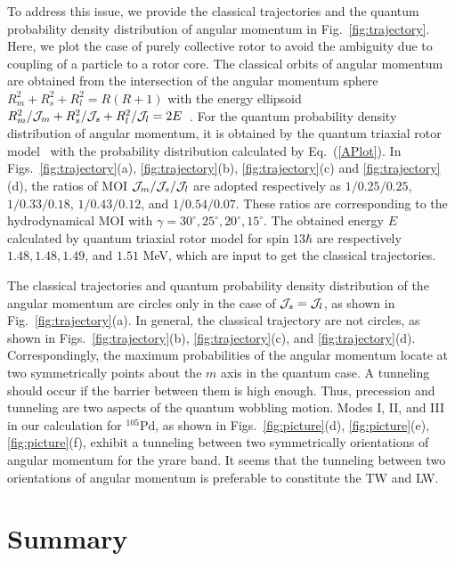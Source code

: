 \documentclass[aps,prc,preprint,showpacs,groupedaddress,floatfix,amsmath,amssymb]{revtex4-1}
\begin{document}
To address
this issue, we provide the classical trajectories and the quantum probability density distribution of angular momentum in Fig.~\ref{fig:trajectory}. Here, we plot the case of purely collective rotor to avoid the ambiguity due to coupling of a particle to a rotor core.
The classical orbits of angular momentum are obtained from  the intersection of the angular momentum sphere
$R_{m}^{2}+R_{s}^{2}+R_{l}^{2}=R(R+1)$
with the energy ellipsoid
$R_{m}^{2}/{\cal J}_{m}+R_{s}^{2}/{\cal J}_{s}+R_{l}^{2}/{\cal J}_{l}=2E$~\cite{Landau,Lawrie20,Frauendorf14}.
For the quantum probability density distribution of angular momentum, it is obtained by the quantum triaxial rotor model~\cite{Bohr75} with  the probability distribution calculated by Eq.~(\ref{APlot}).
In Figs.~\ref{fig:trajectory}(a), \ref{fig:trajectory}(b), \ref{fig:trajectory}(c) and \ref{fig:trajectory}(d), the ratios of MOI ${\cal J}_{m}/{\cal J}_{s}/{\cal J}_{l}$ are adopted respectively as $1/0.25/0.25$, $1/0.33/0.18$, $1/0.43/0.12$, and $1/0.54/0.07$. These ratios are corresponding to the hydrodynamical MOI with $\gamma=30^{\circ},25^{\circ},20^{\circ},15^{\circ}$.
The obtained energy $E$ calculated by quantum triaxial rotor model for spin $13\hbar$ are respectively $1.48, 1.48, 1.49$, and $1.51$ MeV, which are input to get the classical trajectories.


The classical trajectories  and quantum probability density distribution  of the angular momentum are circles only in the case of ${\cal J}_{s}={\cal J}_{l}$, as shown in Fig.~\ref{fig:trajectory}(a).
In general, the classical trajectory are not circles, as shown in Figs.~\ref{fig:trajectory}(b), \ref{fig:trajectory}(c), and \ref{fig:trajectory}(d). Correspondingly,
the maximum probabilities of the angular momentum locate at two symmetrically points about the $m$ axis in the quantum case. A tunneling should occur if the barrier between them is high enough.
Thus,  precession and tunneling are two aspects of the quantum wobbling motion.
Modes I, II, and III in our calculation for $^{105}$Pd, as shown in Figs.~\ref{fig:picture}(d), \ref{fig:picture}(e), \ref{fig:picture}(f), exhibit a tunneling between two symmetrically
orientations of angular momentum for the yrare band.
It seems that the tunneling between two orientations of angular momentum is preferable to constitute the TW and LW.




\section{Summary}
\end{document}
